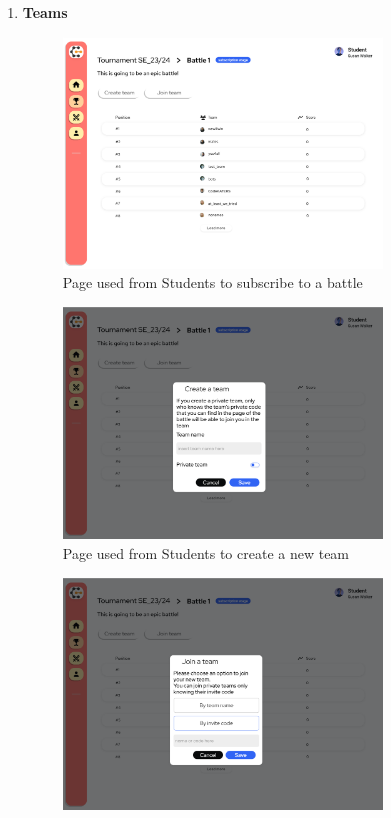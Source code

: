 \begin{enumerate}[label=\textbf{F\arabic*)}]
    \item \textbf{Teams}\\
    \begin{figure}[H]
        \centering
        \includegraphics[width=0.8\textwidth]{Mockups/11_student_battle_subscription.png}
        \caption{Page used from Students to subscribe to a battle}
    \end{figure}
    \begin{figure}[H]
        \centering
        \includegraphics[width=0.8\textwidth]{Mockups/12_student_create_team.png}
        \caption{Page used from Students to create a new team}
    \end{figure}
    \begin{figure}[H]
        \centering
        \includegraphics[width=0.8\textwidth]{Mockups/13_student_join_team.png}

\end{figure}
\end{enumerate}
